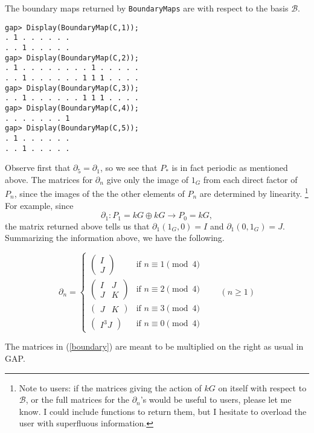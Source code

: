 \documentclass[12pt]{article}
\begin{document}
The boundary maps returned by \verb!BoundaryMaps! are with respect
to the basis $\mathcal{B}$.
\begin{verbatim}
gap> Display(BoundaryMap(C,1));
. 1 . . . . . .
. . 1 . . . . .
gap> Display(BoundaryMap(C,2));
. 1 . . . . . . . . 1 . . . . .
. . 1 . . . . . . 1 1 1 . . . .
gap> Display(BoundaryMap(C,3));
. . 1 . . . . . . 1 1 1 . . . .
gap> Display(BoundaryMap(C,4));
. . . . . . . 1
gap> Display(BoundaryMap(C,5));
. 1 . . . . . .
. . 1 . . . . .
\end{verbatim}
Observe first that $\partial_5=\partial_1$,
so we see that $P_\ast$ is in fact
periodic as mentioned above. 
The matrices for $\partial_n$ give only the image of $1_G$
from each direct factor of $P_n$, since the images of the
the other elements of $P_n$ are determined by linearity.
\footnote{Note to users: if the matrices giving the action
of $kG$ on itself with respect to $\mathcal{B}$, or the full
matrices for the $\partial_n$'s would be useful to users,
please let me know. I could include functions to return them,
but I hesitate to overload the user with superfluous information.}
For example, since \[\partial_1:P_1=kG\oplus kG\to P_0=kG,\]
the matrix returned above tells us that $\partial_1\left(1_G,0\right)=I$
and $\partial_1\left(0,1_G\right)=J$. Summarizing the information
above, we have the following.

\begin{equation}\label{boundary}
\partial_n=\begin{cases}
\begin{pmatrix}I\\J\end{pmatrix}&\text{if }n\equiv 1\pmod{4}\\
\begin{pmatrix}I&J\\J&K\end{pmatrix}&\text{if }n\equiv 2\pmod{4}\\
\begin{pmatrix}J&K\end{pmatrix}&\text{if }n\equiv 3\pmod{4}\\
\begin{pmatrix}I^3J\end{pmatrix}&\text{if }n\equiv 0\pmod{4}
\end{cases}\qquad\left(n\ge 1\right)
\end{equation}

The matrices in (\ref{boundary}) are meant to be multiplied on the right
as usual in \textsf{GAP}.
\end{document}
